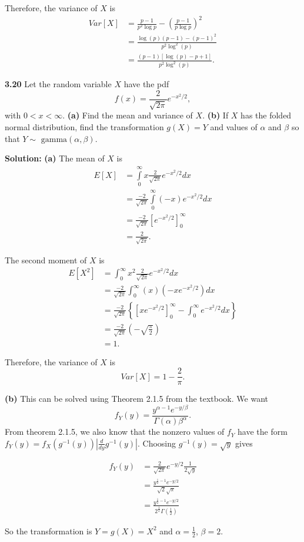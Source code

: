 \documentclass{article}
\newcommand{\mybox}{%
    \collectbox{%
        \setlength{\fboxsep}{1pt}%
        \fbox{\BOXCONTENT}%
    }%
}
\begin{document}
\noindent Therefore, the variance of $X$ is
\begin{align}
Var[X] &= \frac{p-1}{p^2 \log p} - \left(\frac{p - 1}{p \log p}\right)^2 \\ 
&= \frac{\log (p) (p-1) - (p-1)^2}{p^2 \log^2(p)} \\
&= \frac{(p-1)\left[\log(p) - p + 1\right]}{p^2 \log^2(p)}.
\end{align}

\pagebreak

\noindent\mybox{\textbf{3.20}}  Let the random variable $X$ have the pdf $$f(x) = \frac{2}{\sqrt{2\pi}}e^{-x^2/2},$$ with $0<x< \infty$.  \textbf{(a)} Find the mean and variance of $X$.  \textbf{(b)}  If $X$ has the folded normal distribution, find the transformation $g(X) = Y$ and values of $\alpha$ and $\beta$ so that $Y \sim \text{ gamma}(\alpha, \beta)$.  

\vspace{3mm}

\noindent\mybox{\textbf{Solution:}}  \textbf{(a)} The mean of $X$ is 
\begin{align}
E[X] &= \int\limits_{0}^{\infty}x\frac{2}{\sqrt{2\pi}}e^{-x^2/2}dx \\
&=\frac{-2}{\sqrt{2\pi}}\int\limits_{0}^{\infty}(-x)e^{-x^2/2}dx \\
&=\frac{-2}{\sqrt{2\pi}}\left[ e^{-x^2/2}\right]_{0}^{\infty} \\
&= \frac{2}{\sqrt{2\pi}}.
\end{align}

\noindent The second moment of $X$ is 
\begin{align}
E[X^2] &= \int_{0}^{\infty}x^2\frac{2}{\sqrt{2\pi}}e^{-x^2/2}dx \\
&= \frac{-2}{\sqrt{2\pi}}\int_{0}^{\infty}(x)(-xe^{-x^2/2})dx \\
&= \frac{-2}{\sqrt{2\pi}}\left\lbrace\left[xe^{-x^2/2} \right]_{0}^{\infty} - \int_{0}^{\infty}e^{-x^2/2}dx\right\rbrace \\
&= \frac{-2}{\sqrt{2\pi}}\left(-\sqrt{\frac{\pi}{2}}\right) \\
&= 1.
\end{align}

\noindent Therefore, the variance of $X$ is $$Var[X] = 1 - \frac{2}{\pi}.$$

\vspace{3mm}

\noindent \textbf{(b)}   This can be solved using Theorem 2.1.5 from the textbook.  We want $$f_Y(y) = \frac{y^{\alpha -1} e^{-y/\beta}}{\Gamma(\alpha)\beta^{\alpha}}.$$  From theorem 2.1.5, we also know that the nonzero values of $f_Y$ have the form $f_Y(y) = f_X(g^{-1}(y))|\frac{d}{dy}g^{-1}(y)|$.  Choosing $g^{-1}(y) = \sqrt{y}$ gives

\begin{align}
f_Y(y) &= \frac{2}{\sqrt{2\pi}}e^{-y/2}\frac{1}{2\sqrt{y}} \\ 
&= \frac{y^{\frac{1}{2} - 1}e^{-y/2}}{\sqrt{2}\sqrt{\pi}} \\
&= \frac{y^{\frac{1}{2} - 1}e^{-y/2}}{2^{\frac{1}{2}}\Gamma\left(\frac{1}{2}\right)}
\end{align}

\noindent So the transformation is $Y=g(X) = X^2$ and $\alpha = \frac{1}{2}$, $\beta = 2$.  
\end{document}
